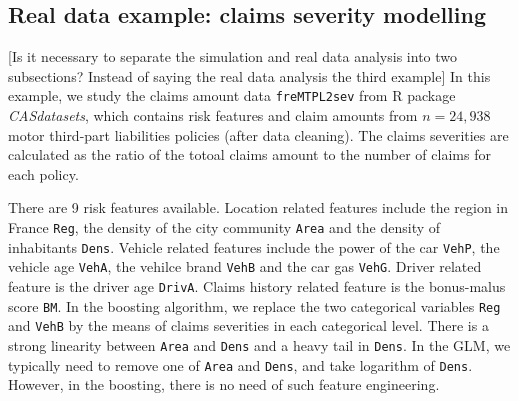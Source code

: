 \documentclass[11pt]{article}
\numberwithin{equation}{section}
\begin{document}


\subsection{Real data example: claims severity modelling}\label{sec:third example}

{\color{blue}[Is it necessary to separate the simulation and real data analysis into two subsections? Instead of saying the real data analysis the third example]}
In this example, we study the claims amount data {\tt freMTPL2sev} from R package {\it CASdatasets}, which contains risk features and  claim amounts from $n=24,938$ motor third-part liabilities policies (after data cleaning). 
The claims severities are calculated as the ratio of the totoal claims amount to the number of claims for each policy.

There are 9 risk features available. 
Location related features include the region in France {\tt Reg}, the density of the city community {\tt Area} and the density of inhabitants {\tt Dens}.
Vehicle related features include the power of the car {\tt VehP}, the vehicle age {\tt VehA}, the vehilce brand {\tt VehB} and the car gas {\tt VehG}.
Driver related feature is the driver age {\tt DrivA}. 
Claims history related feature is the bonus-malus score  {\tt BM}.  
In the boosting algorithm, we replace the two categorical variables {\tt Reg} and {\tt VehB} by the means of claims severities in each categorical level.
There is a strong linearity between {\tt Area} and {\tt Dens} and a heavy tail in {\tt Dens}. 
In the GLM, we typically need to remove one of {\tt Area} and {\tt Dens}, and take logarithm of {\tt Dens}.
However, in the boosting, there is no need of such feature engineering.
\end{document}
